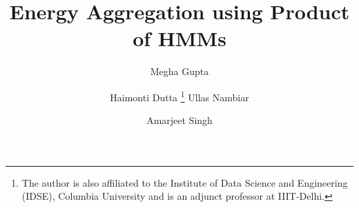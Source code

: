 \documentclass[runningheads,a4paper]{llncs}
\begin{document}
\mainmatter  %

\title{Energy Aggregation using Product of HMMs}


%
%

\author{Megha Gupta \and Haimonti Dutta
\thanks{The author is also affiliated to the Institute of Data Science and Engineering (IDSE), Columbia University and is an adjunct professor at IIIT-Delhi.}
Ullas Nambiar \and Amarjeet Singh}


%
\end{document}
